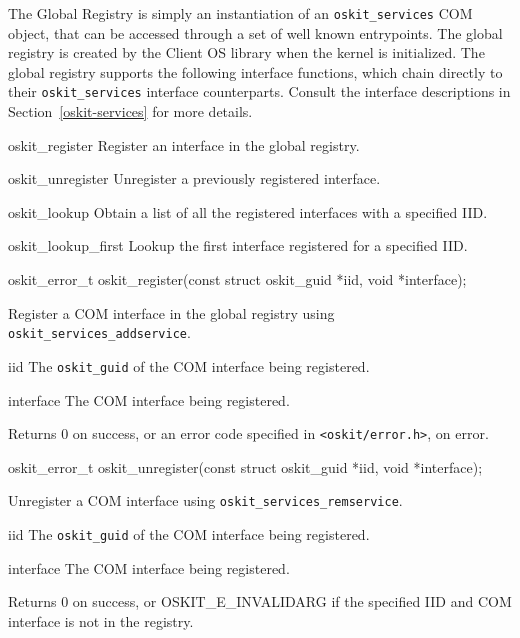 \label{glob-reg}

The Global Registry is simply an instantiation of an
\texttt{oskit_services} COM object, that can be accessed through a set of
well known entrypoints. The global registry is created by the Client OS
library when the kernel is initialized. The global registry supports the
following interface functions, which chain directly to their
\texttt{oskit_services} interface counterparts. Consult the interface
descriptions in Section~\ref{oskit-services} for more details.
\begin{icsymlist}
\item[oskit_register]
	Register an interface in the global registry.
\item[oskit_unregister]
	Unregister a previously registered interface.
\item[oskit_lookup]
	Obtain a list of all the registered interfaces with a specified IID.
\item[oskit_lookup_first]
	Lookup the first interface registered for a specified IID.
\end{icsymlist}

\begin{apisyn}

	\funcproto oskit_error_t
	oskit_register(const struct oskit_guid *iid, void *interface);
\end{apisyn}
\begin{apidesc}
	Register a COM interface in the global registry using
	\texttt{oskit_services_addservice}.
\end{apidesc}
\begin{apiparm}
	\item[iid]
		The {\tt oskit_guid} of the COM interface being registered.
	\item[interface]
		The COM interface being registered.
\end{apiparm}
\begin{apiret}
	Returns 0 on success, or an error code specified in
	{\tt <oskit/error.h>}, on error.
\end{apiret}

\begin{apisyn}

	\funcproto oskit_error_t
	oskit_unregister(const struct oskit_guid *iid, void *interface);
\end{apisyn}
\begin{apidesc}
	Unregister a COM interface using \texttt{oskit_services_remservice}.
\end{apidesc}
\begin{apiparm}
	\item[iid]
		The {\tt oskit_guid} of the COM interface being registered.
	\item[interface]
		The COM interface being registered.
\end{apiparm}
\begin{apiret}
	Returns 0 on success, or OSKIT_E_INVALIDARG if the specified IID
	and COM interface is not in the registry.
\end{apiret}


